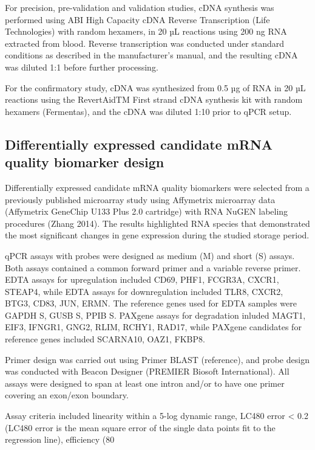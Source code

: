For precision, pre-validation and validation studies, cDNA synthesis was performed using ABI High Capacity cDNA Reverse Transcription (Life Technologies) with random hexamers, in 20 µL reactions using 200 ng RNA extracted from blood. Reverse transcription was conducted under standard conditions as described in the manufacturer's manual, and the resulting cDNA was diluted 1:1 before further processing. 

For the confirmatory study, cDNA was synthesized from 0.5 µg of RNA in 20 µL reactions using the RevertAidTM First strand cDNA synthesis kit with random hexamers (Fermentas), and the cDNA was diluted 1:10 prior to qPCR setup.

\subsection*{Differentially expressed candidate mRNA quality biomarker design}
Differentially expressed candidate mRNA quality biomarkers were selected from a previously published microarray study using Affymetrix microarray data (Affymetrix GeneChip U133 Plus 2.0 cartridge) with RNA NuGEN labeling procedures (Zhang 2014). The results highlighted RNA species that demonstrated the most significant changes in gene expression during the studied storage period.

qPCR assays with probes were designed as medium (M) and short (S) assays. Both assays contained a common forward primer and a variable reverse primer. EDTA assays for upregulation included CD69, PHF1, FCGR3A, CXCR1, STEAP4, while EDTA assays for downregulation included TLR8, CXCR2, BTG3, CD83, JUN, ERMN. The reference genes used for EDTA samples were GAPDH S, GUSB S, PPIB S. PAXgene assays for degradation inluded MAGT1, EIF3, IFNGR1, GNG2, RLIM, RCHY1, RAD17, while PAXgene candidates for reference genes included SCARNA10, OAZ1, FKBP8. 

Primer design was carried out using Primer BLAST (reference), and probe design was conducted with Beacon Designer (PREMIER Biosoft International). All assays were designed to span at least one intron and/or to have one primer covering an exon/exon boundary. 

Assay criteria included linearity within a 5-log dynamic range, LC480 error < 0.2 (LC480 error is the mean square error of the single data points fit to the regression line), efficiency (80%


